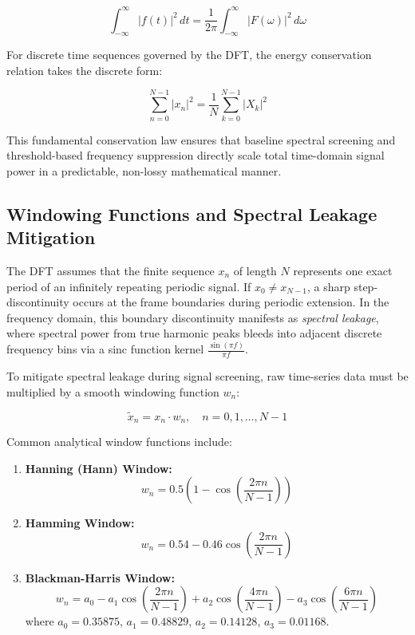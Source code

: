 \documentclass[11pt,a4paper]{article}
\begin{document}
\begin{equation}
\int_{-\infty}^{\infty} |f(t)|^2 \, dt = \frac{1}{2\pi} \int_{-\infty}^{\infty} |F(\omega)|^2 \, d\omega
\end{equation}

For discrete time sequences governed by the DFT, the energy conservation relation takes the discrete form:

\begin{equation}
\sum_{n=0}^{N-1} |x_n|^2 = \frac{1}{N} \sum_{k=0}^{N-1} |X_k|^2
\end{equation}

This fundamental conservation law ensures that baseline spectral screening and threshold-based frequency suppression directly scale total time-domain signal power in a predictable, non-lossy mathematical manner.

\subsection{Windowing Functions and Spectral Leakage Mitigation}

The DFT assumes that the finite sequence $x_n$ of length $N$ represents one exact period of an infinitely repeating periodic signal. If $x_0 \neq x_{N-1}$, a sharp step-discontinuity occurs at the frame boundaries during periodic extension. In the frequency domain, this boundary discontinuity manifests as \emph{spectral leakage}, where spectral power from true harmonic peaks bleeds into adjacent discrete frequency bins via a sinc function kernel $\frac{\sin(\pi f)}{\pi f}$.

To mitigate spectral leakage during signal screening, raw time-series data must be multiplied by a smooth windowing function $w_n$:

\begin{equation}
\tilde{x}_n = x_n \cdot w_n, \quad n = 0, 1, \dots, N-1
\end{equation}

Common analytical window functions include:

\begin{enumerate}
    \item \textbf{Hanning (Hann) Window:}
    \begin{equation}
    w_n = 0.5 \left( 1 - \cos\left(\frac{2\pi n}{N-1}\right) \right)
    \end{equation}
    \item \textbf{Hamming Window:}
    \begin{equation}
    w_n = 0.54 - 0.46 \cos\left(\frac{2\pi n}{N-1}\right)
    \end{equation}
    \item \textbf{Blackman-Harris Window:}
    \begin{equation}
    w_n = a_0 - a_1 \cos\left(\frac{2\pi n}{N-1}\right) + a_2 \cos\left(\frac{4\pi n}{N-1}\right) - a_3 \cos\left(\frac{6\pi n}{N-1}\right)
    \end{equation}
    where $a_0 = 0.35875$, $a_1 = 0.48829$, $a_2 = 0.14128$, $a_3 = 0.01168$.
\end{enumerate}
\end{document}
